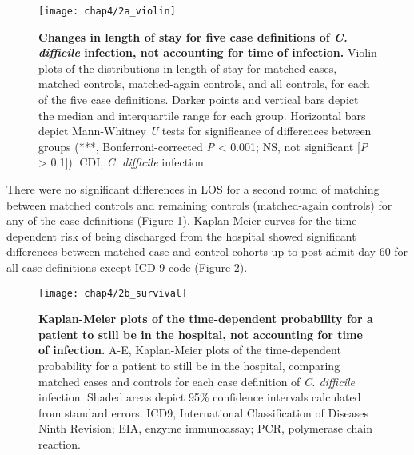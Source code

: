 \begin{figure}[htb]
  \texttt{[image: chap4/2a\_violin]}
  \caption[Changes in length of stay for five case definitions of \emph{C. difficile} infection, not accounting for time of infection]{
    \textbf{Changes in length of stay for five case definitions of \emph{C. difficile} infection, not accounting for time of infection.} Violin plots of the distributions in length of stay for matched cases, matched controls, matched-again controls, and all controls, for each of the five case definitions. Darker points and vertical bars depict the median and interquartile range for each group. Horizontal bars depict Mann-Whitney \emph{U} tests for significance of differences between groups (***, Bonferroni-corrected \emph{P} < 0.001; NS, not significant [\emph{P} > 0.1]). CDI, \emph{C. difficile} infection.
  }
  \label{fig:violin}
\end{figure}
There were no significant differences in LOS for a second round of matching between matched controls and remaining controls (matched-again controls) for any of the case definitions (Figure \ref{fig:violin}). Kaplan-Meier curves for the time-dependent risk of being discharged from the hospital showed significant differences between matched case and control cohorts up to post-admit day 60 for all case definitions except ICD-9 code (Figure \ref{fig:survival}).

\begin{figure}[htb]
  \texttt{[image: chap4/2b\_survival]}
  \caption[Kaplan-Meier plots for length of stay, not accounting for time of infection]{
    \textbf{Kaplan-Meier plots of the time-dependent probability for a patient to still be in the hospital, not accounting for time of infection.} A-E, Kaplan-Meier plots of the time-dependent probability for a patient to still be in the hospital, comparing matched cases and controls for each case definition of \emph{C. difficile} infection. Shaded areas depict 95\% confidence intervals calculated from standard errors. ICD9, International Classification of Diseases Ninth Revision; EIA, enzyme immunoassay; PCR, polymerase chain reaction.
  }
  \label{fig:survival}
\end{figure}

